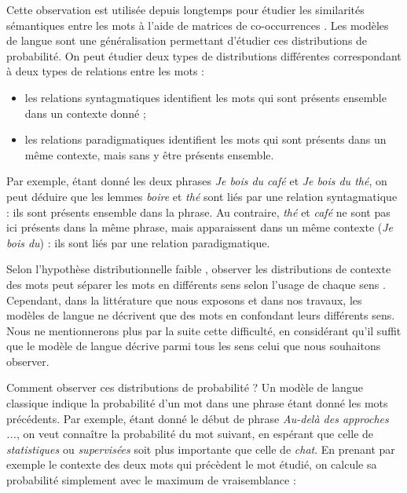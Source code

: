 Cette observation est utilisée depuis longtemps pour étudier les similarités
sémantiques entre les mots à l'aide de matrices de co-occurrences
\citep{miller1967empirical}. Les modèles de langue sont une généralisation
permettant d'étudier ces distributions de probabilité. On peut étudier deux
types de distributions différentes correspondant à deux types de relations
entre les mots \citep{sahlgren2008distributional} :

\begin{itemize}
    \item les relations syntagmatiques identifient les mots qui sont présents
        ensemble dans un contexte donné ;
    \item les relations paradigmatiques identifient les mots qui sont présents
        dans un même contexte, mais sans y être présents ensemble.
\end{itemize}

Par exemple, étant donné les deux phrases \emph{Je bois du café} et \emph{Je
bois du thé}, on peut déduire que les lemmes \emph{boire} et \emph{thé} sont
liés par une relation syntagmatique : ils sont présents ensemble dans la
phrase. Au contraire, \emph{thé} et \emph{café} ne sont pas ici présents dans
la même phrase, mais apparaissent dans un même contexte (\emph{Je bois du}) :
ils sont liés par une relation paradigmatique.

Selon l'hypothèse distributionnelle faible \citep{lenci2008distributional},
observer les distributions de contexte des mots peut séparer les mots en
différents sens selon l'usage de chaque sens
\citep{yarowsky1993one,pantel2002discovering,pedersen2010duluth}. Cependant,
dans la littérature que nous exposons et dans nos travaux, les modèles de
langue ne décrivent que des mots en confondant leurs différents sens. Nous ne
mentionnerons plus par la suite cette difficulté, en considérant qu'il suffit
que le modèle de langue décrive parmi tous les sens celui que nous souhaitons
observer.

Comment observer ces distributions de probabilité ? Un modèle de langue
classique indique la probabilité d'un mot dans une phrase étant donné les mots
précédents. Par exemple, étant donné le début de phrase \emph{Au-delà des
approches ...}, on veut connaître la probabilité du mot suivant, en espérant
que celle de \emph{statistiques} ou \emph{supervisées} soit plus importante que
celle de \emph{chat}. En prenant par exemple le contexte des deux mots qui
précèdent le mot étudié, on calcule sa probabilité simplement avec le maximum
de vraisemblance :

